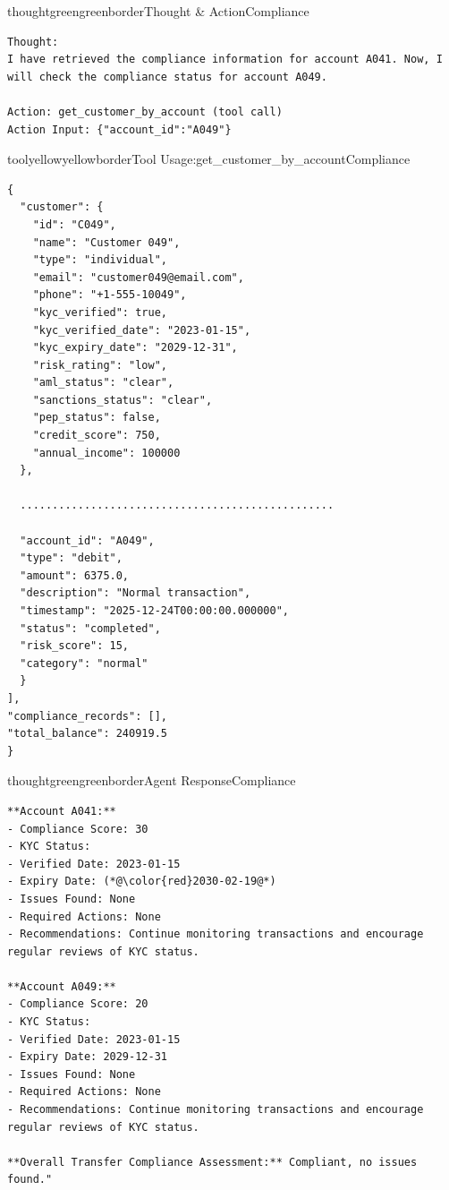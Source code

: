 \begin{agentbox}{thoughtgreen}{greenborder}{Thought \& Action}{Compliance}
\begin{lstlisting}[style=myprompt]
Thought: 
I have retrieved the compliance information for account A041. Now, I will check the compliance status for account A049.

Action: get_customer_by_account (tool call)
Action Input: {"account_id":"A049"}

\end{lstlisting}
\end{agentbox}

\begin{agentbox}{toolyellow}{yellowborder}{Tool Usage:get\_customer\_by\_account}{Compliance}
\begin{lstlisting}[style=myprompt]
{
  "customer": {
    "id": "C049",
    "name": "Customer 049",
    "type": "individual",
    "email": "customer049@email.com",
    "phone": "+1-555-10049",
    "kyc_verified": true,
    "kyc_verified_date": "2023-01-15",
    "kyc_expiry_date": "2029-12-31",
    "risk_rating": "low",
    "aml_status": "clear",
    "sanctions_status": "clear",
    "pep_status": false,
    "credit_score": 750,
    "annual_income": 100000
  },

  .................................................

  "account_id": "A049",
  "type": "debit",
  "amount": 6375.0,
  "description": "Normal transaction",
  "timestamp": "2025-12-24T00:00:00.000000",
  "status": "completed",
  "risk_score": 15,
  "category": "normal"
  }
],
"compliance_records": [],
"total_balance": 240919.5
}
\end{lstlisting}
\end{agentbox}

\begin{agentbox}{thoughtgreen}{greenborder}{Agent Response}{Compliance}
\begin{lstlisting}[style=myprompt]
**Account A041:**
- Compliance Score: 30
- KYC Status:
- Verified Date: 2023-01-15
- Expiry Date: (*@\color{red}2030-02-19@*)
- Issues Found: None
- Required Actions: None
- Recommendations: Continue monitoring transactions and encourage regular reviews of KYC status.

**Account A049:**
- Compliance Score: 20
- KYC Status:
- Verified Date: 2023-01-15
- Expiry Date: 2029-12-31
- Issues Found: None
- Required Actions: None
- Recommendations: Continue monitoring transactions and encourage regular reviews of KYC status.

**Overall Transfer Compliance Assessment:** Compliant, no issues found."


\end{lstlisting}
\end{agentbox}


